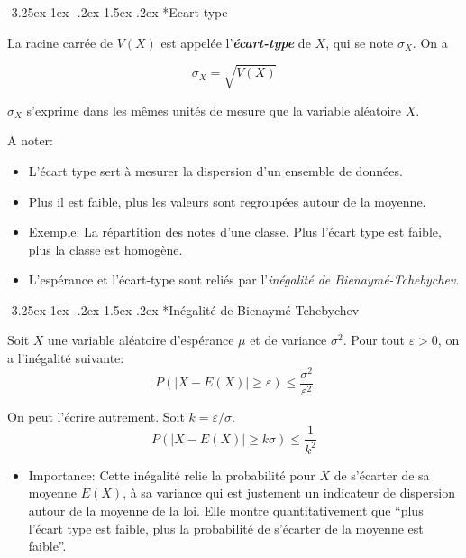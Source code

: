 \documentclass[]{book}
\makeatletter
\newenvironment{rmdblock}[1]
  {\begin{shaded*}
  \begin{itemize}
  \renewcommand{\labelitemi}{
    \raisebox{-.7\height}[0pt][0pt]{
      {\setkeys{Gin}{width=2em,keepaspectratio}\texttt{[image: img/icons/\#1]}}
    }
  }
  \item
  }
  {
  \end{itemize}
  \end{shaded*}
  }
\newenvironment{rmdinsight}
  {\begin{rmdblock}{insight}}
  {\end{rmdblock}}
\renewcommand\subsection{\@startsection{subsection}{2}{\z@}%
                                     {-3.25ex\@plus -1ex \@minus -.2ex}%
                                     {1.5ex \@plus .2ex}%
                                     {\normalfont\large\bfseries\color{Violet}}}
\renewcommand\subsubsection{\@startsection{subsubsection}{3}{\z@}%
                                     {-3.25ex\@plus -1ex \@minus -.2ex}%
                                     {1.5ex \@plus .2ex}%
                                     {\normalfont\normalsize\bfseries\color{Violet}}}
\theoremstyle{magentacolor}
\theoremstyle{proprie}
\theoremstyle{exstyle}
\theoremstyle{exostyle}
\theoremstyle{definition}
\theoremstyle{definition}
\theoremstyle{definition}
\theoremstyle{remark}
\let\BeginKnitrBlock\begin \let\EndKnitrBlock\end
\makeatother
\begin{document}
\hypertarget{ecart-type}{%
\subsection*{Ecart-type}\label{ecart-type}}

\BeginKnitrBlock{definition}
\protect\hypertarget{def:unnamed-chunk-15}{}{\label{def:unnamed-chunk-15} }La racine carrée de \(V(X)\) est appelée l'\textbf{\emph{écart-type}} de \(X\), qui se
note \(\sigma_{X}\). On a

\[\sigma_{X} = \sqrt{V(X)}\]

\(\sigma_{X}\) s'exprime dans les mêmes unités de mesure que la variable
aléatoire \(X\).
\EndKnitrBlock{definition}

A noter:

\begin{itemize}
\item
  L'écart type sert à mesurer la dispersion d'un ensemble de données.
\item
  Plus il est faible, plus les valeurs sont regroupées autour de la
  moyenne.
\item
  Exemple: La répartition des notes d'une classe. Plus l'écart type
  est faible, plus la classe est homogène.
\item
  L'espérance et l'écart-type sont reliés par l'\emph{inégalité de
  Bienaymé-Tchebychev}.
\end{itemize}

\hypertarget{inegalite-de-bienayme-tchebychev}{%
\subsubsection*{Inégalité de Bienaymé-Tchebychev}\label{inegalite-de-bienayme-tchebychev}}

\BeginKnitrBlock{theorem}
\protect\hypertarget{thm:unnamed-chunk-16}{}{\label{thm:unnamed-chunk-16} }Soit \(X\) une variable aléatoire d'espérance \(\mu\) et de variance
\(\sigma^2\). Pour tout \(\varepsilon > 0\), on a l'inégalité suivante:
\[P\left(|X-E(X)| \geq \varepsilon \right) \leq \frac{\sigma^2}{\varepsilon^2}\]

On peut l'écrire autrement. Soit \(k=\varepsilon/\sigma\).
\[P\left(|X-E(X)| \geq k\sigma \right) \leq \frac{1}{k^2}\]
\EndKnitrBlock{theorem}

\begin{rmdinsight}
{Importance}: Cette inégalité relie la probabilité pour \(X\) de
s'écarter de sa moyenne \(E(X)\), à sa variance qui est justement un
indicateur de dispersion autour de la moyenne de la loi. Elle montre
quantitativement que ``plus l'écart type est faible, plus la probabilité
de s'écarter de la moyenne est faible''.
\end{rmdinsight}
\end{document}
